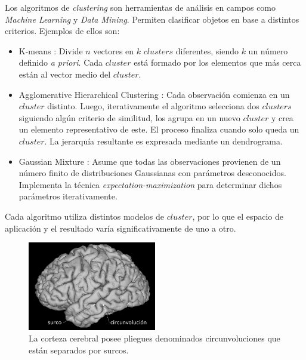 Los algoritmos de \textit{clustering} son herramientas de an\'alisis en
campos como \textit{Machine Learning} y \textit{Data Mining}. Permiten
clasificar objetos en base a distintos criterios. Ejemplos de ellos son: 

\begin{itemize}
    \item K-means \cite{Hartigan1979}: Divide $n$ vectores en $k$ 
                   $clusters$ diferentes, siendo $k$ un n\'umero definido 
                   {\it a priori}. Cada $cluster$ est\'a
                   formado por los elementos que m\'as cerca est\'an al
                   vector medio del $cluster$.
    \item Agglomerative Hierarchical Clustering \cite{Mining2009}:
                   Cada observaci\'on
                   comienza en un $cluster$ distinto. Luego, iterativamente
                   el algoritmo selecciona dos $clusters$ siguiendo alg\'un
                   criterio de similitud, los agrupa en un nuevo $cluster$ 
                   y crea un elemento representativo de este. El proceso
                   finaliza cuando solo queda un $cluster$. La jerarqu\'ia
                   resultante es expresada mediante un dendrograma.
    \item Gaussian Mixture \cite{Mining2009}: Asume que todas las
                   observaciones provienen de
                   un n\'umero finito de distribuciones Gaussianas con 
                   par\'ametros desconocidos. Implementa la t\'ecnica
                   \textit{expectation-maximization} para determinar
                   dichos par\'ametros iterativamente.
\end{itemize}

Cada algoritmo utiliza distintos modelos de $cluster$, por lo que el
espacio de aplicaci\'on y el resultado var\'ia significativamente de uno a
otro. \\

\begin{figure}
    \centering
    \includegraphics[width=0.5\textwidth]{img/cerebro.png}
    \raggedleft
    \caption{La corteza cerebral posee pliegues denominados 
             circunvoluciones que est\'an separados por surcos.}
    \label{fig:cerebro}
\end{figure}

